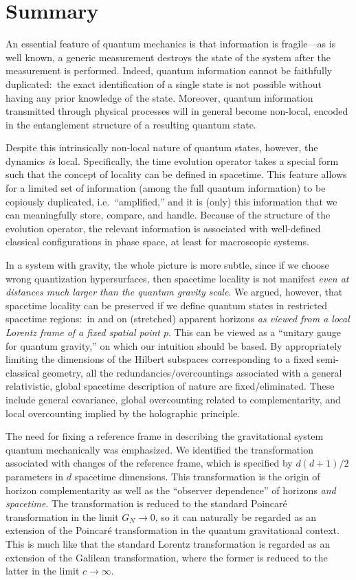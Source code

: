 \documentclass[12pt]{article}
\begin{document}
\section{Summary}
\label{sec:summary}

An essential feature of quantum mechanics is that information is fragile---as 
is well known, a generic measurement destroys the state of the system 
after the measurement is performed.  Indeed, quantum information cannot 
be faithfully duplicated:\ the exact identification of a single state is 
not possible without having any prior knowledge of the state.  Moreover, 
quantum information transmitted through physical processes will in 
general become non-local, encoded in the entanglement structure of 
a resulting quantum state.

Despite this intrinsically non-local nature of quantum states, however, 
the dynamics {\it is} local.  Specifically, the time evolution operator 
takes a special form such that the concept of locality can be defined 
in spacetime.  This feature allows for a limited set of information 
(among the full quantum information) to be copiously duplicated, i.e.\ 
``amplified,'' and it is (only) this information that we can meaningfully 
store, compare, and handle.  Because of the structure of the evolution 
operator, the relevant information is associated with well-defined 
classical configurations in phase space, at least for macroscopic systems.

In a system with gravity, the whole picture is more subtle, since if we 
choose wrong quantization hypersurfaces, then spacetime locality is not 
manifest {\it even at distances much larger than the quantum gravity scale}. 
We argued, however, that spacetime locality can be preserved if we define 
quantum states in restricted spacetime regions:\ in and on (stretched) 
apparent horizons {\it as viewed from a local Lorentz frame of a fixed 
spatial point $p$}.  This can be viewed as a ``unitary gauge for quantum 
gravity,'' on which our intuition should be based.  By appropriately 
limiting the dimensions of the Hilbert subspaces corresponding to a fixed 
semi-classical geometry, all the redundancies/overcountings associated 
with a general relativistic, global spacetime description of nature are 
fixed/eliminated.  These include general covariance, global overcounting 
related to complementarity, and local overcounting implied by the 
holographic principle.

The need for fixing a reference frame in describing the gravitational 
system quantum mechanically was emphasized.  We identified the 
transformation associated with changes of the reference frame, which 
is specified by $d(d+1)/2$ parameters in $d$ spacetime dimensions. 
This transformation is the origin of horizon complementarity as well 
as the ``observer dependence'' of horizons {\it and spacetime}. 
The transformation is reduced to the standard Poincar\'{e} transformation 
in the limit $G_N \rightarrow 0$, so it can naturally be regarded as an 
extension of the Poincar\'{e} transformation in the quantum gravitational 
context.  This is much like that the standard Lorentz transformation 
is regarded as an extension of the Galilean transformation, where the 
former is reduced to the latter in the limit $c \rightarrow \infty$.
\end{document}
